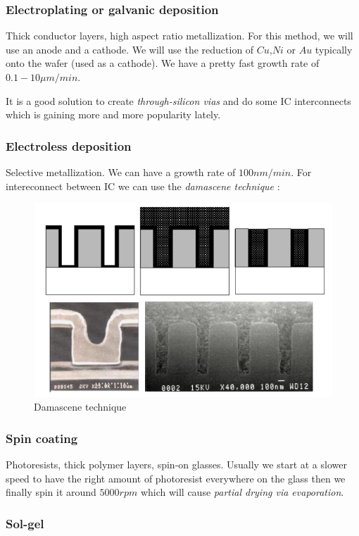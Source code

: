 \documentclass{report}
\begin{document}
\subsubsection{Electroplating or galvanic deposition}

Thick conductor layers, high aspect ratio metallization. For this method, we will use an anode and a cathode. We will use the reduction of $Cu$,$Ni$ or $Au$ typically onto the wafer (used as a cathode). We have a pretty fast growth rate of $0.1-10 \mu m/min$.

It is a good solution to create \textit{through-silicon vias} and do some IC interconnects which is gaining more and more popularity lately.

\subsubsection{Electroless deposition} 

Selective metallization. We can have a growth rate of $100nm/min$. For intereconnect between IC we can use the \textit{damascene technique} :

\begin{figure}[H]
    \centering
    \includegraphics[width=0.5\linewidth]{damascene_technique.png}
    \caption{Damascene technique}
    \label{fig:enter-label}
\end{figure}

\subsubsection{Spin coating}

Photoresists, thick polymer layers, spin-on glasses. Usually we start at a slower speed to have the right amount of photoresist everywhere on the glass then we finally spin it around $5000 rpm$ which will cause \textit{partial drying via evaporation}.

\subsubsection{Sol-gel}
\end{document}

